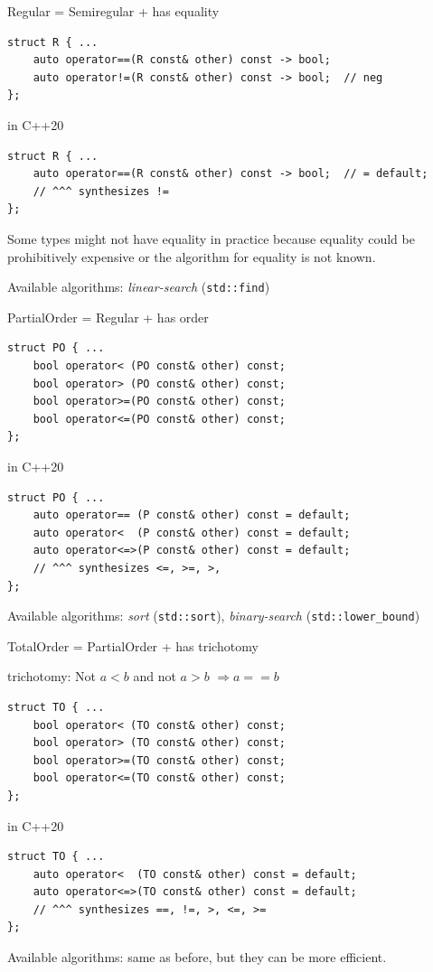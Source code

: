 \documentclass[t,aspectratio=169,handout]{beamer}
\begin{document}
\begin{frame}[fragile]{Regular = Semiregular + has equality}

	\begin{lstlisting}
struct R { ...
	auto operator==(R const& other) const -> bool;
	auto operator!=(R const& other) const -> bool;  // neg
};
\end{lstlisting}
	\pause
	in C++20
	\begin{lstlisting}
struct R { ...
	auto operator==(R const& other) const -> bool;  // = default;
	// ^^^ synthesizes !=
};
\end{lstlisting}

Some types might not have equality in practice because equality could be prohibitively expensive or the algorithm for equality is not known.

Available algorithms: \emph{linear-search} (\lstinline{std::find})
\end{frame}

\begin{frame}[fragile]{PartialOrder = Regular + has order}

	\begin{lstlisting}
struct PO { ...
	bool operator< (PO const& other) const;
	bool operator> (PO const& other) const;
	bool operator>=(PO const& other) const;
	bool operator<=(PO const& other) const;
};
\end{lstlisting}
	\pause
	in C++20
	\begin{lstlisting}
struct PO { ...
	auto operator== (P const& other) const = default;
	auto operator<  (P const& other) const = default;
	auto operator<=>(P const& other) const = default;
	// ^^^ synthesizes <=, >=, >,
};
\end{lstlisting}

	Available algorithms: \emph{sort} (\lstinline{std::sort}), \emph{binary-search} (\lstinline{std::lower_bound})
\end{frame}

\begin{frame}[fragile]{TotalOrder = PartialOrder + has trichotomy}

trichotomy: Not $a < b$ and not $a > b$ $\Rightarrow a == b$

\begin{lstlisting}
struct TO { ...
	bool operator< (TO const& other) const;
	bool operator> (TO const& other) const;
	bool operator>=(TO const& other) const;
	bool operator<=(TO const& other) const;
};
\end{lstlisting}

	in C++20
	\begin{lstlisting}
struct TO { ...
	auto operator<  (TO const& other) const = default;
	auto operator<=>(TO const& other) const = default;
	// ^^^ synthesizes ==, !=, >, <=, >=
};
\end{lstlisting}

Available algorithms: same as before, but they can be more efficient.

\end{frame}
\end{document}
